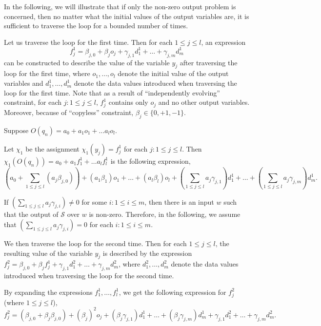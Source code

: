 \documentclass[runningheads,a4paper]{llncs}
\def\Ss{{\mathcal{S} }}
\begin{document}
In the following, we will illustrate that if only the non-zero output problem is concerned, then no matter what the initial values of the output variables are, it is sufficient to traverse the loop for a bounded number of times.


Let us traverse the loop for the first time. Then for each $1 \le j \le l$, an expression 
\[f^1_{j} = \beta_{j,0} + \beta_{j} o_{j} + \gamma_{j,1} d^1_1 + \dots + \gamma_{j,m} d^1_m\] 
can be constructed to describe the value of the variable $y_{j}$ after traversing the loop for the first time, where $o_1,\dots,o_l$ denote the initial value of the output variables and $d^1_1, \dots, d^1_m$ denote the data values introduced when traversing the loop for the first time. Note that as a result of ``independently evolving'' constraint, for each $j: 1 \le j \le l$, $f^1_{j}$ contains only $o_{j}$ and no other output variables. Moreover, because of ``copyless'' constraint, $\beta_j \in \{0,+1,-1\}$.

Suppose $O(q_n)=a_0 + a_1 o_1 + \dots a_l o_l$. 

Let $\chi_1$ be the assignment $\chi_1(y_j)=f^1_j$ for each $j: 1\le j \le l$.
Then $\chi_1(O(q_n)) = a_0+ a_1 f^1_1 + \dots a_l f^1_l$ is the following expression,
\[
(a_0 + \sum \limits_{1 \le j \le l} (a_j\beta_{j,0})) +  (a_1 \beta_1) o_1 + \dots + (a_l \beta_l) o_l + (\sum \limits_{1 \le j \le l} a_j \gamma_{j,1}) d^1_1 + \dots + (\sum \limits_{1 \le j \le l} a_j \gamma_{j,m}) d^1_m.
\]

If $(\sum \limits_{1 \le j \le l} a_j \gamma_{j,i}) \neq 0$ for some $i: 1 \le i \le m$, then there is an input $w$ such that the output of $\Ss$ over $w$ is non-zero. Therefore, in the following, we assume that $(\sum \limits_{1 \le j \le l} a_j \gamma_{j,i}) = 0$ for each $i: 1 \le i \le m$.

We then traverse the loop for the second time. Then for each $1 \le j \le l$,  the resulting value of the variable $y_{j}$ is described by the expression $f^2_{j} = \beta_{j,0} + \beta_{j} f^1_{j} + \gamma_{j,1} d^2_1 + \dots + \gamma_{j,m} d^2_m$, where $d^2_1, \dots, d^2_m$ denote the data values introduced when traversing the loop for the second time. 

By expanding the expressions $f^1_1,\dots, f^1_l$, we get the following expression for $f^2_{j}$ (where $1 \le j \le l$),
\[
f^2_{j} = (\beta_{j,0} + \beta_{j} \beta_{j,0}) + (\beta_{j})^2 o_{j} +
(\beta_{j}\gamma_{j,1}) d^1_1 +\dots + (\beta_{j}\gamma_{j,m}) d^1_m  + 
\gamma_{j,1} d^2_1 + \dots + \gamma_{j,m} d^2_m.
\]
\end{document}
